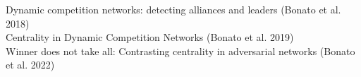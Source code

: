 \documentclass[preview]{standalone}
\begin{document}
Dynamic competition networks: detecting alliances and leaders (Bonato et al. 2018)\\Centrality in Dynamic Competition Networks (Bonato et al. 2019)\\Winner does not take all: Contrasting centrality in adversarial networks (Bonato et al. 2022)\\
\end{document}
